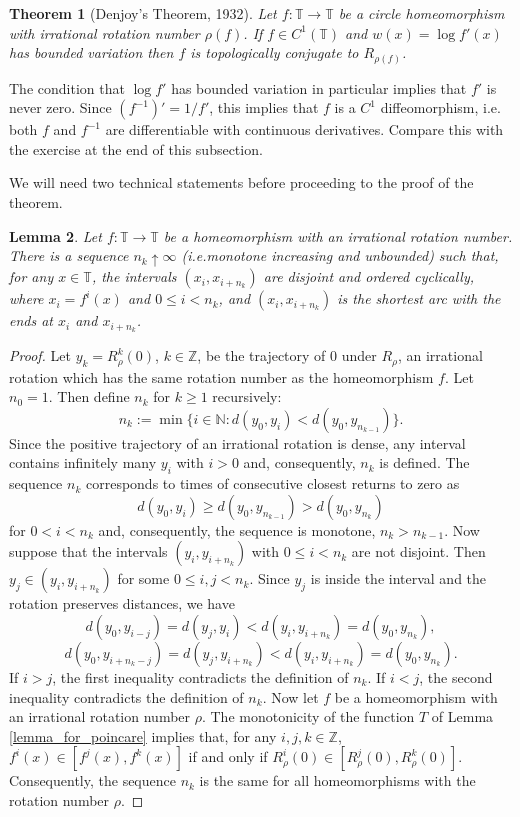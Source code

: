 \documentclass[12pt]{article}
\newtheorem{theorem}{Theorem}[section]
\newtheorem{lemma}[theorem]{Lemma}
\theoremstyle{definition}
\theoremstyle{remark}
\begin{document}
\begin{theorem} [Denjoy's Theorem, 1932]\label{thm: denjoy}
Let $f : \mathbb T \to \mathbb T$ be a circle homeomorphism with irrational rotation number $\rho(f)$.
If $f \in C^1(\mathbb T)$ and $w(x) = \log f'(x)$ has bounded variation then $f$ is topologically conjugate
to $R_{\rho(f)}$.
\end{theorem}


\noindent
The condition that $\log f'$ has bounded variation in particular implies that 
$f'$ is never zero. Since $(f^{-1})' = 1/f'$, this implies that $f$ is a $C^1$ diffeomorphism, i.e.
both $f$ and $f^{-1}$ are differentiable with continuous derivatives. Compare this with the exercise at the end of this subsection.

\medskip
We will need two technical statements before proceeding to the proof of
the theorem.

\begin{lemma} \label{lemma_for_denjoy1}
Let $f : \mathbb T \to \mathbb T$ be a homeomorphism with an irrational rotation
number. There is a sequence $n_k \uparrow \infty$ (i.e.monotone increasing and unbounded)
such that, for any $x \in \mathbb T$, the intervals $(x_i, x_{i+n_k} )$ are disjoint and ordered cyclically, where $x_i = f^i(x)$
and $0 \le i < n_k$, and $(x_i, x_{i+n_k} )$ is the shortest arc with the ends at $x_i$ and
$x_{i+n_k}$.
\end{lemma}

\begin{proof}
Let $y_k = R_\rho^k(0)$, $k \in \mathbb Z$, be the trajectory of $0$ under $R_\rho$, an
irrational rotation which has the same rotation number as the homeomorphism
$f$.
Let $n_0 = 1$. Then define $n_k$ for $k \ge 1$ recursively:
\[
n_k := \min\{ i \in \mathbb N : d(y_0, y_i) < d(y_0, y_{n_{k-1}}) \}.
\]
Since the positive trajectory of an irrational rotation is dense, any interval
contains infinitely many $y_i$ with $i > 0$ and, consequently, $n_k$ is defined. The
sequence $n_k$ corresponds to times of consecutive closest returns to zero as
\[
d(y_0, y_i) \ge d(y_0, y_{n_{k-1}}) > d(y_0, y_{n_k} )
\]
for $0 < i < n_k$ and, consequently, the sequence is monotone, $n_k > n_{k-1}$.
Now suppose that the intervals $(y_i, y_{i+n_k})$ with $0 \le i < n_k$ are not
disjoint. Then $y_j \in (y_i, y_{i+n_k} )$ for some $0 \le i, j < n_k$. Since $y_j$ is inside the
interval and the rotation preserves distances, we have
\[
d(y_0, y_{i-j}) = d(y_j, y_i) < d(y_i, y_{i+n_k}) = d(y_0, y_{n_k} ),
\]
\[
d(y_0, y_{i+n_{k}-j}) = d(y_j, y_{i+n_k} ) < d(y_i, y_{i+n_k}) = d(y_0, y_{n_k} ).
\]
If $i > j$, the first inequality contradicts the definition of $n_k$. If $i < j$, the
second inequality contradicts the definition of $n_k$.
Now let $f$ be a homeomorphism with an irrational rotation number
$\rho$. The monotonicity of the function $T$ of Lemma \ref{lemma_for_poincare} implies that, for any
$i, j, k \in \mathbb Z$, $f^i(x) \in  [f^j(x), f^k(x)]$ if and only if $R_\rho^i(0) \in [R_\rho^j(0),R_\rho^k(0)]$.
Consequently, the sequence $n_k$ is the same for all homeomorphisms with the
rotation number $\rho$.
\end{proof}
\end{document}

